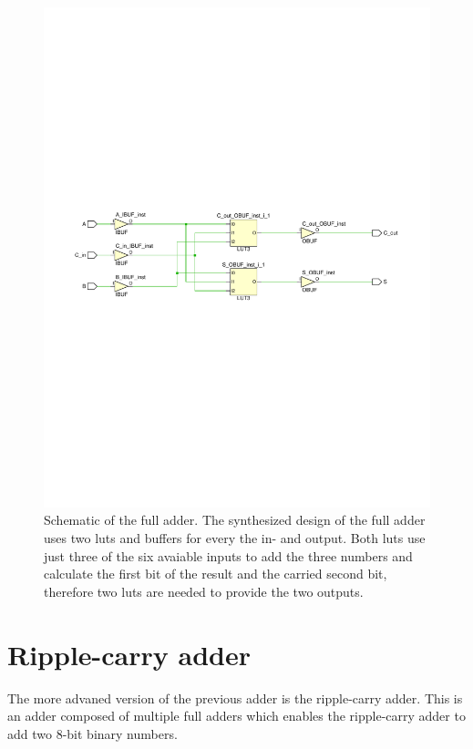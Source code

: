 \begin{figure}[h]
	\centering
	\includegraphics[width=\linewidth, trim=0mm 110mm 0mm 110mm]{./L1/E4/schematic.pdf}
	\caption{Schematic of the full adder. The synthesized design of the full adder uses two \glspl{lut} and buffers for every the in- and output. Both \glspl{lut} use just three of the six avaiable inputs to add the three numbers and calculate the first bit of the result and the carried second bit, therefore two \glspl{lut} are needed to provide the two outputs.}
	\label{fig: Full Adder schematic}
\end{figure}



\section{Ripple-carry adder}

The more advaned version of the previous adder is the ripple-carry adder. This is an adder composed of multiple full adders which enables the ripple-carry adder to add two 8-bit binary numbers.

